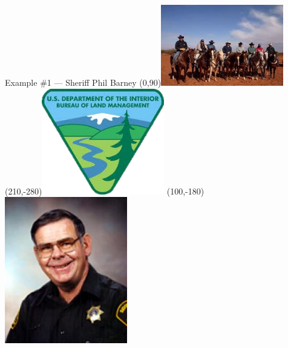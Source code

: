 \begin{frame}{Example \#1 --- Sheriff Phil Barney}
    \Put(0,90){\includegraphics[height=0.5\textheight,keepaspectratio=true,width=0.4\textwidth]{img/barney-ranchers.png}}
    \Put(210,-280){\includegraphics[height=0.5\textheight,keepaspectratio=true,width=0.4\textwidth]{img/blm.png}}
    \Put(100,-180){\includegraphics[height=0.5\textheight,keepaspectratio=true,width=0.4\textwidth]{img/phil-barney.png}}
\end{frame}

